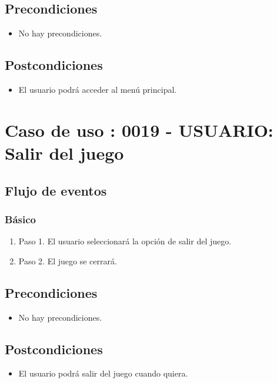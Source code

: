 \subsection{Precondiciones}
\begin{itemize}
\item No hay precondiciones.
\end{itemize}

\subsection{Postcondiciones}
\begin{itemize}
\item El usuario podrá acceder al menú principal.
\end{itemize}



\section{Caso de uso : 0019 - USUARIO: Salir del juego}\label{sec:uc0}
\subsection{Flujo de eventos}
\subsubsection{Básico}

\begin{enumerate}
\item Paso 1.
El usuario seleccionará la opción de salir del juego. 
\item Paso 2.
El juego se cerrará.
\end{enumerate}

\subsection{Precondiciones}
\begin{itemize}
\item No hay precondiciones.
\end{itemize}

\subsection{Postcondiciones}
\begin{itemize}
\item El usuario podrá salir del juego cuando quiera. 
\end{itemize}




